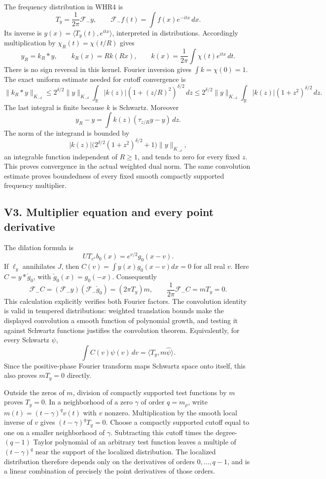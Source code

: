 The frequency distribution in WHR4 is \[
T_y=\frac1{2\pi}\mathcal F_-y,
\qquad \mathcal F_-f(t)=\int f(x)e^{-itx}\,dx.
\] Its inverse is \(y(x)=\langle T_y(t),e^{itx}\rangle\), interpreted in
distributions. Accordingly multiplication by \(\chi_R(t)=\chi(t/R)\)
gives \[
y_R=k_R*y,\qquad
k_R(x)=Rk(Rx),\qquad
k(x)=\frac1{2\pi}\int\chi(t)e^{itx}\,dt.
\] There is no sign reversal in this kernel. Fourier inversion gives
\(\int k=\chi(0)=1\). The exact uniform estimate needed for cutoff
convergence is \[
\|k_R*y\|_{K_{-\delta}}
\leq 2^{\delta/2}\|y\|_{K_{-\delta}}
\int_{\mathbb R}|k(z)|(1+(z/R)^2)^{\delta/2}\,dz
\leq 2^{\delta/2}\|y\|_{K_{-\delta}}
\int_{\mathbb R}|k(z)|(1+z^2)^{\delta/2}\,dz.
\] The last integral is finite because \(k\) is Schwartz. Moreover \[
y_R-y=\int k(z)(\tau_{z/R}y-y)\,dz.
\] The norm of the integrand is bounded by \[
|k(z)|\bigl(2^{\delta/2}(1+z^2)^{\delta/2}+1\bigr)
\|y\|_{K_{-\delta}},
\] an integrable function independent of \(R\ge1\), and tends to zero
for every fixed \(z\). This proves convergence in the actual weighted
dual norm. The same convolution estimate proves boundedness of every
fixed smooth compactly supported frequency multiplier.

\subsection{V3. Multiplier equation and every point
derivative}\label{v3.-multiplier-equation-and-every-point-derivative}

The dilation formula is \[
UT_{e^v}b_0(x)=e^{v/2}g_0(x-v).
\] If \(\ell_y\) annihilates \(J\), then \(C(v)=\int y(x)g_0(x-v)dx=0\)
for all real \(v\). Here \(C=y*\check g_0\), with
\(\check g_0(x)=g_0(-x)\). Consequently \[
\mathcal F_-C
=(\mathcal F_-y)(\mathcal F_-\check g_0)
=(2\pi T_y)m,
\qquad
\frac1{2\pi}\mathcal F_-C=mT_y=0.
\] This calculation explicitly verifies both Fourier factors. The
convolution identity is valid in tempered distributions: weighted
translation bounds make the displayed convolution a smooth function of
polynomial growth, and testing it against Schwartz functions justifies
the convolution theorem. Equivalently, for every Schwartz \(\psi\), \[
\int C(v)\psi(v)\,dv
=\langle T_y,m\widehat\psi\rangle.
\] Since the positive-phase Fourier transform maps Schwartz space onto
itself, this also proves \(mT_y=0\) directly.

Outside the zeros of \(m\), division of compactly supported test
functions by \(m\) proves \(T_y=0\). In a neighborhood of a zero
\(\gamma\) of order \(q=m_\rho\), write \(m(t)=(t-\gamma)^qv(t)\) with
\(v\) nonzero. Multiplication by the smooth local inverse of \(v\) gives
\((t-\gamma)^qT_y=0\). Choose a compactly supported cutoff equal to one
on a smaller neighborhood of \(\gamma\). Subtracting this cutoff times
the degree-\((q-1)\) Taylor polynomial of an arbitrary test function
leaves a multiple of \((t-\gamma)^q\) near the support of the localized
distribution. The localized distribution therefore depends only on the
derivatives of orders \(0,\ldots,q-1\), and is a linear combination of
precisely the point derivatives of those orders.

